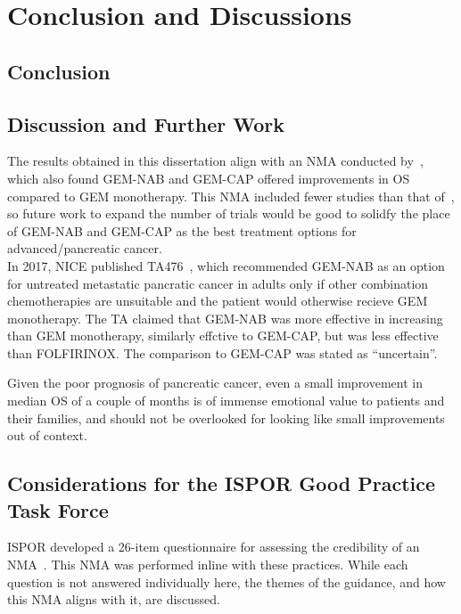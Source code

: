 \chapter{Conclusion and Discussions}\label{conclusions}

\section{Conclusion}

\section{Discussion and Further Work}
The results obtained in this dissertation align with an NMA conducted by~\cite{gresham2014}, which also found GEM-NAB and GEM-CAP offered improvements in OS compared to GEM monotherapy. This NMA included fewer studies than that of~\cite{gresham2014}, so future work to expand the number of trials would be good to solidfy the place of GEM-NAB and GEM-CAP as the best treatment options for advanced/pancreatic cancer. \\

In 2017, NICE published TA476~\cite{TA476}, which recommended GEM-NAB as an option for untreated metastatic pancratic cancer in adults only if other combination chemotherapies are unsuitable and the patient would otherwise recieve GEM monotherapy. The TA claimed that GEM-NAB was more effective in increasing than GEM monotherapy, similarly effctive to GEM-CAP, but was less effective than FOLFIRINOX. The comparison to GEM-CAP was stated as ``uncertain''.


Given the poor prognosis of pancreatic cancer, even a small improvement in median OS of a couple of months is of immense emotional value to patients and their families, and should not be overlooked for looking like small improvements out of context.

\section{Considerations for the ISPOR Good Practice Task Force}
ISPOR developed a 26-item questionnaire for assessing the credibility of an NMA~\cite{jansengp}. This NMA was performed inline with these practices. While each question is not answered individually here, the themes of the guidance, and how this NMA aligns with it, are discussed. \\

